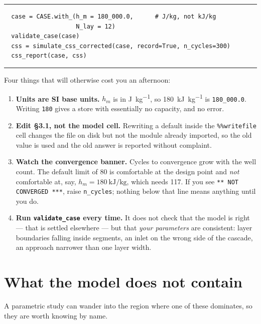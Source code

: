 \documentclass[11pt,a4paper]{article}
\newcommand{\hm}{\ensuremath{h_{m}}}
\newcommand{\code}[1]{\texttt{\small #1}}
\begin{document}
\begingroup
\small
\noindent\rule{\linewidth}{0.4pt}
\begin{verbatim}
  case = CASE.with_(h_m = 180_000.0,      # J/kg, not kJ/kg
                    N_lay = 12)
  validate_case(case)
  css = simulate_css_corrected(case, record=True, n_cycles=300)
  css_report(case, css)
\end{verbatim}
\vspace{-1.2em}
\noindent\rule{\linewidth}{0.4pt}
\endgroup
\medskip

Four things that will otherwise cost you an afternoon:

\begin{enumerate}\itemsep3pt
\item \textbf{Units are SI base units.} $\hm$ is in \si{\joule\per\kilogram}, so
  \SI{180}{\kilo\joule\per\kilogram} is \code{180\_000.0}. Writing \code{180}
  gives a store with essentially no capacity, and no error.

\item \textbf{Edit \S3.1, not the model cell.} Rewriting a default inside the
  \code{\%\%writefile} cell changes the file on disk but not the module already
  imported, so the old value is used and the old answer is reported without
  complaint.

\item \textbf{Watch the convergence banner.} Cycles to convergence grow with the
  well count. The default limit of 80 is comfortable at the design point and
  \emph{not} comfortable at, say, $\hm=\SI{180}{\kilo\joule\per\kilogram}$,
  which needs 117. If you see \code{*** NOT CONVERGED ***}, raise
  \code{n\_cycles}; nothing below that line means anything until you do.

\item \textbf{Run \code{validate\_case} every time.} It does not check that the
  model is right --- that is settled elsewhere --- but that \emph{your
  parameters} are consistent: layer boundaries falling inside segments, an inlet
  on the wrong side of the cascade, an approach narrower than one layer width.
\end{enumerate}

\section{What the model does not contain}
\label{sec:limits}

A parametric study can wander into the region where one of these dominates, so
they are worth knowing by name.
\end{document}
